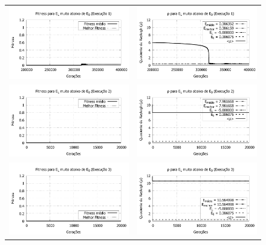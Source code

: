 \begin{figure}[p]
	\centering
  \begin{tabular}{@{}cc@{}}
 			
		\includegraphics[width=.40\textwidth]{figs/resultados/variandoEL/T4E1_fitness-extendido.pdf} &
    \includegraphics[width=.40\textwidth]{figs/resultados/variandoEL/T4E1_rho_extendido.pdf}   \\

		\includegraphics[width=.40\textwidth]{figs/resultados/variandoEL/T4E2_fitness-extendido.pdf} &
    \includegraphics[width=.40\textwidth]{figs/resultados/variandoEL/T4E2_rho_extendido.pdf}   \\
		
		\includegraphics[width=.40\textwidth]{figs/resultados/variandoEL/T4E3_fitness-extendido.pdf} &
    \includegraphics[width=.40\textwidth]{figs/resultados/variandoEL/T4E3_rho_extendido.pdf}   \\
		

\end{tabular}
\end{figure}

